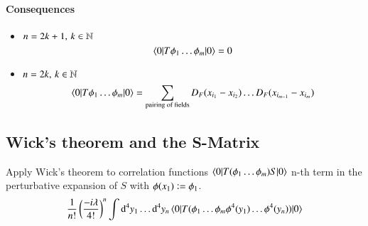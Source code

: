 \paragraph{Consequences}
\begin{itemize}
	\item $n = 2k+1, \, k \in \mathbb{N}$
		\[
		\braket{0 | T \phi_1 \dots \phi_m | 0} = 0
		\]
	\item $n = 2k, \, k \in \mathbb{N}$	
		\[
			\braket{0 | T \phi_1 \dots \phi_m | 0} = \sum_{\text{pairing of fields}} D_F(x_{i_1}-x_{i_2})\dots D_F(x_{i_{m-1}}-x_{i_m})
		\]
\end{itemize}

\subsection{Wick's theorem and the S-Matrix}
Apply Wick's theorem to correlation functions $\braket{0 | T (\phi_1 \dots \phi_m ) S | 0}$ n-th term in the perturbative expansion of $S$ with $\phi(x_1) \vcentcolon = \phi_1$.
\begin{align*}
   \frac{1}{n!} \left(\frac{-i\lambda}{4!}\right)^n \int \dd^4 y_1 \dots \dd^4 y_n \braket{0 | T ( \phi_1 \dots \phi_m  \phi^4(y_1) \dots \phi^4(y_n) ) | 0}
\end{align*}

